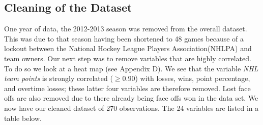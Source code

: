 \subsection*{Cleaning of the Dataset}
One year of data, the 2012-2013 season was removed from the overall dataset. This was due to that season having been shortened to 48 games because of a lockout between the National Hockey League Players Association(NHLPA) and team owners. Our next step was to remove variables that are highly correlated. To do so we look at a heat map (see Appendix D). We see that the variable \textit{NHL team points }is strongly correlated ($\geq 0.90$) with losses, wins, point percentage, and overtime losses; these latter four variables are therefore removed. Lost face offs are also removed due to there already being face offs won in the data set. We now have our cleaned dataset of 270 observations. The 24 variables are listed in a table below.
